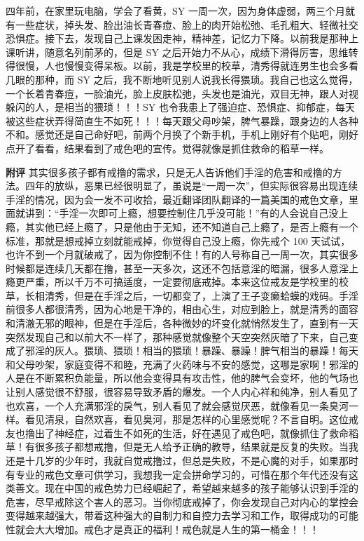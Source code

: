 \begin{case}
    四年前，在家里玩电脑，学会了看黄，SY 一周一次，因为身体虚弱，两三个月就有一些症状，掉头发、脸出油长青春痘、脸上的肉开始松弛、毛孔粗大、轻微社交恐惧症。接下去，发现自己上课发困走神，精神差，记忆力下降。以前我是那种上课听讲，随意名列前茅的，但是 SY 之后开始力不从心，成绩下滑得厉害，思维转得很慢，人也慢慢变得呆板。以前，我是学校里的校草，清秀得就连男生也会多看几眼的那种，而 SY 之后，我不断地听见别人说我长得猥琐。我自己也这么觉得，一个长着青春痘，一脸油光，脸上皮肤松弛，头发也是油光，双目无神，跟人对视躲闪的人，是相当的猥琐！！！SY 也令我患上了强迫症、恐惧症、抑郁症，每天被这些症状弄得简直生不如死！！！每天跟父母吵架，脾气暴躁，跟身边的人各种不和。感觉还是自己命好吧，前两个月换了个新手机，手机上刚好有个贴吧，刚好点开了看看，结果看到了戒色吧的宣传。觉得就像是抓住救命的稻草一样。

    \textbf{附评} 其实很多孩子都有戒撸的需求，只是无人告诉他们手淫的危害和戒撸的方法。四年的放纵，恶果已经很明显了，虽说是“一周一次”，但实际很容易出现连续手淫的情况，因为会一发不可收拾，最近翻译团队翻译的一篇美国的戒色文章，里面就讲到：“手淫一次即可上瘾，想要控制住几乎没可能！”有的人会说自己没上瘾，其实他已经上瘾了，只是他由于无知，还不知道自己上瘾了，是否上瘾有一个标准，那就是想戒掉立刻就能戒掉，你觉得自己没上瘾，你先戒个 100 天试试，也许不到一个月就破戒了，因为你控制不住！有的人号称自己一周一次，其实很多时候都是连续几天都在撸，甚至一天多次，这还不包括意淫的暗漏，很多人意淫上瘾更严重，所以千万不可搞适度，一定要彻底戒掉。本来这位戒友是学校里的校草，长相清秀，但是在手淫之后，一切都变了，上演了王子变癞蛤蟆的戏码。手淫前很多人都很清秀，因为心地是干净的，相由心生，对应到脸上，就是清秀的面容和清澈无邪的眼神，但是在手淫后，各种微妙的坏变化就悄然发生了，直到有一天突然发现自己和以前大不一样了，那种感觉就像整个天空突然灰暗了下来，自己变成了邪淫的灰人。猥琐、猥琐！相当的猥琐！暴躁、暴躁！脾气相当的暴躁！每天和父母吵架，家庭变得不和睦，充满了火药味与不安的感觉，这哪是家啊！邪淫的人是在不断累积负能量，所以他会变得具有攻击性，他的脾气会变坏，他的气场也让别人感觉很不舒服，很容易导致矛盾的爆发。一个人内心祥和纯净，别人看见了也欢喜，一个人充满邪淫的戾气，别人看见了就会感觉厌恶，就像看见一条臭河一样。看见清泉，自然欢喜，看见臭河，那是怎样的心里感觉呢？不言自明。这位戒友也撸出了神经症，过着生不如死的生活，好在遇见了戒色吧，就像抓住了救命稻草！有很多孩子都想戒撸，但是无人给予正确的教导，结果就是反复的失败。当我还是十几岁的少年时，我就自觉戒撸过，但总是失败，不是心魔的对手，如果那时有专业的戒色文章可供学习，我想我一定会拼命学习的，可惜在那个年代还没有这类善文。现在中国的戒色势力已经崛起了，希望越来越多的孩子能够认识到手淫的危害，尽早戒除这个害人的恶习。当你彻底戒掉了，你会发现自己对内心的掌控会变得越来越强大，带着这种强大的自制力和自控力去学习和工作，取得成功的可能性就会大大增加。戒色才是真正的福利！戒色就是人生的第一桶金！！！
\end{case}

